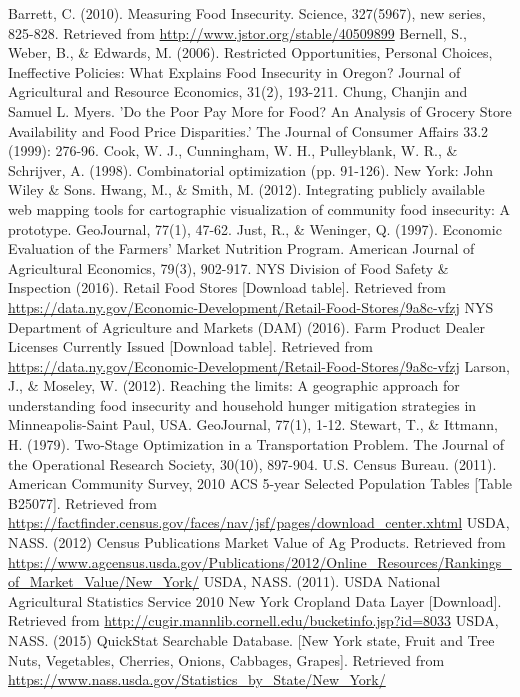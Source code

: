 \documentclass{report}
\begin{document}
\begin{thebibliography}{99}
Barrett, C. (2010). Measuring Food Insecurity. Science, 327(5967), new series, 825-828. Retrieved from \url{http://www.jstor.org/stable/40509899}
Bernell, S., Weber, B., {\&} Edwards, M. (2006). Restricted Opportunities, Personal Choices, Ineffective Policies: What Explains Food Insecurity in Oregon? Journal of Agricultural and Resource Economics, 31(2), 193-211. 
 Chung, Chanjin and Samuel L. Myers. 'Do the Poor Pay More for Food? An Analysis of Grocery Store Availability and Food Price Disparities.' The Journal of Consumer Affairs 33.2 (1999): 276-96.
 Cook, W. J., Cunningham, W. H., Pulleyblank, W. R.,  {\&}  Schrijver, A. (1998). Combinatorial optimization (pp. 91-126). New York: John Wiley  {\&}  Sons.
 Hwang, M., {\&} Smith, M. (2012). Integrating publicly available web mapping tools for cartographic visualization of community food insecurity: A prototype. GeoJournal, 77(1), 47-62.
 Just, R., {\&} Weninger, Q. (1997). Economic Evaluation of the Farmers' Market Nutrition Program. American Journal of Agricultural Economics, 79(3), 902-917.
 NYS Division of Food Safety {\&} Inspection (2016). Retail Food Stores [Download table]. Retrieved from \url{https://data.ny.gov/Economic-Development/Retail-Food-Stores/9a8c-vfzj}
 NYS Department of Agriculture and Markets (DAM) (2016). Farm Product Dealer Licenses Currently Issued [Download table]. Retrieved from \url{https://data.ny.gov/Economic-Development/Retail-Food-Stores/9a8c-vfzj}
 Larson, J., {\&} Moseley, W. (2012). Reaching the limits: A geographic approach for understanding food insecurity and household hunger mitigation strategies in Minneapolis-Saint Paul, USA. GeoJournal, 77(1), 1-12.
 Stewart, T., {\&} Ittmann, H. (1979). Two-Stage Optimization in a Transportation Problem. The Journal of the Operational Research Society, 30(10), 897-904.
 U.S. Census Bureau. (2011). American Community Survey, 2010 ACS 5-year Selected Population Tables [Table B25077]. Retrieved from \url{https://factfinder.census.gov/faces/nav/jsf/pages/download_center.xhtml}
 USDA, NASS. (2012) Census Publications Market Value of Ag Products. Retrieved from \url{https://www.agcensus.usda.gov/Publications/2012/Online_Resources/Rankings_of_Market_Value/New_York/}
 USDA, NASS. (2011). USDA National Agricultural Statistics Service 2010 New York Cropland Data Layer [Download]. Retrieved from \url{http://cugir.mannlib.cornell.edu/bucketinfo.jsp?id=8033}
 USDA, NASS. (2015) QuickStat Searchable Database. [New York state, Fruit and Tree Nuts, Vegetables, Cherries, Onions, Cabbages, Grapes]. Retrieved from \url{https://www.nass.usda.gov/Statistics_by_State/New_York/}

\end{thebibliography}
\end{document}
